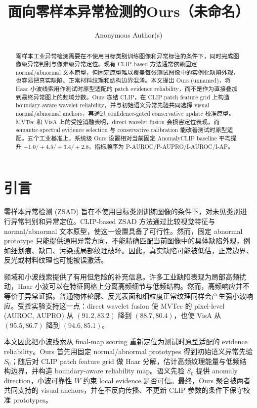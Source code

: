\documentclass[runningheads]{llncs}
\title{面向零样本异常检测的Ours（未命名）}
\author{Anonymous Author(s)}
\institute{Anonymous Institution}
\begin{document}
\maketitle

\begin{abstract}
零样本工业异常检测需要在不使用目标类别训练图像和异常标注的条件下，同时完成图像级异常判别与像素级异常定位。现有 CLIP-based 方法通常依赖固定 normal/abnormal 文本原型，但固定原型难以覆盖每张测试图像中的实例化缺陷外观，也容易把真实缺陷、正常材料纹理和结构边界混淆。本文提出 Ours (unnamed)，将 Haar 小波线索用作测试时原型适配的 patch evidence reliability，而不是作为直接叠加到最终异常图上的频域分数。Ours 冻结 CLIP，在 CLIP patch feature grid 上构造 boundary-aware wavelet reliability，并与初始语义异常先验共同选择 visual normal/abnormal anchors，再通过 confidence-gated conservative update 校准原型。MVTec 和 VisA 上的受控消融表明，direct wavelet fusion 会损害定位表现，而 semantic-spectral evidence selection 与 conservative calibration 能改善测试时原型适配。五个工业基准上，系统级 Ours 设置相对当前固定 AnomalyCLIP baseline 平均提升 $+1.0/+4.5/+3.4/+2.8$，指标顺序为 P-AUROC/P-AUPRO/I-AUROC/I-AP。
\end{abstract}

\section{引言}

零样本异常检测 (ZSAD) 旨在不使用目标类别训练图像的条件下，对未见类别进行异常判别和异常定位。CLIP-based ZSAD 方法通过比较视觉特征与 normal/abnormal 文本原型，使这一设置具备了可行性。然而，固定 abnormal prototype 只能提供通用异常方向，不能精确匹配当前图像中的具体缺陷外观，例如细划痕、缺口、污染或局部纹理破坏。因此，真实缺陷可能被低估，正常边界、反光或材料纹理也可能被误激活。

频域和小波线索提供了有用但危险的补充信息。许多工业缺陷表现为局部高频扰动，Haar 小波可以在特征网格上分离高频细节与低频结构。然而，高频响应并不等价于异常证据。普通物体轮廓、反光表面和细粒度正常纹理同样会产生强小波响应。受控实验支持这一点：direct wavelet fusion 使 MVTec 的 pixel-level (AUROC, AUPRO) 从 $(91.2,83.2)$ 降到 $(88.7,80.4)$，也使 VisA 从 $(95.5,86.7)$ 降到 $(94.6,85.1)$。

本文因此把小波线索从 final-map scoring 重新定位为测试时原型适配的 evidence reliability。Ours 首先用固定 normal/abnormal prototypes 得到初始语义异常先验 $S_0$；随后对 CLIP patch feature grid 做 Haar 分解，估计高频纹理能量与低频结构边界，并构造 boundary-aware reliability map。语义先验 $S_0$ 提供 anomaly direction，小波可靠性 $W$ 约束 local evidence 是否可信。最终，Ours 聚合被两者共同支持的 visual anchors，并在不反向传播、不更新 CLIP 参数的条件下保守校准 prototypes。
\end{document}
